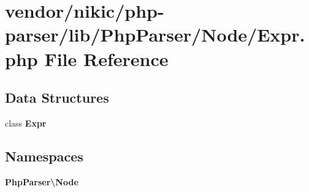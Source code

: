 \section{vendor/nikic/php-\/parser/lib/\+Php\+Parser/\+Node/\+Expr.php File Reference}
\label{_expr_8php}
\subsection*{Data Structures}
\begin{DoxyCompactItemize}
\item 
class {\bf Expr}
\end{DoxyCompactItemize}
\subsection*{Namespaces}
\begin{DoxyCompactItemize}
\item 
 {\bf Php\+Parser\textbackslash{}\+Node}
\end{DoxyCompactItemize}
